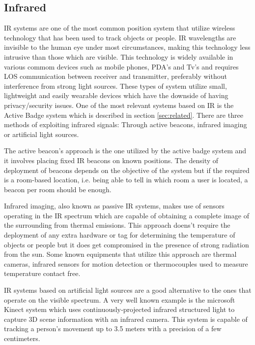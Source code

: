 \subsection{Infrared}
\label{subsec:ir}

\ac{IR} systems are one of the most common position system that utilize wireless technology that has been used to track objects or people. \ac{IR} wavelengths are invisible to the human eye under most circumstances, making this technology less intrusive than those which are visible. This technology is widely available in various commom devices such as mobile phones, PDA's and Tv's and requires \ac{LOS} communication between receiver and transmitter, preferably without interference from strong light sources. These types of system utilize small, lightweight and easily wearable devices which have the downside of having privacy/security issues. One of the most relevant systems based on \ac{IR} is the Active Badge system which is described in section \ref{sec:related}. There are three methods of exploiting infrared signals: Through active beacons, infrared imaging or artificial light sources.

The active beacon's approach is the one utilized by the active badge system and it involves placing fixed \ac{IR} beacons on known positions. The density of deployment of beacons depends on the objective of the system but if the required is a room-based location, i.e. being able to tell in which room a user is located, a beacon per room should be enough.

Infrared imaging, also known as passive \ac{IR} systems, makes use of sensors operating in the \ac{IR} spectrum which are capable of obtaining a complete image of the surrounding from thermal emissions. This approach doens't require the deployment of any extra hardware or tag for determining the temperature of objects or people but it does get compromised in the presence of strong radiation from the sun. Some known equipments that utilize this approach are thermal cameras, infrared sensors for motion detection or thermocouples used to measure temperature contact free. 

\ac{IR} systems based on artificial light sources are a good alternative to the ones that operate on the visible spectrum. A very well known example is the microsoft Kinect system which uses continuously‐projected infrared structured light to capture 3D scene information	with an	infrared camera. This system is capable of tracking a person's movement up to 3.5 meters with a precision of a few centimeters. 


